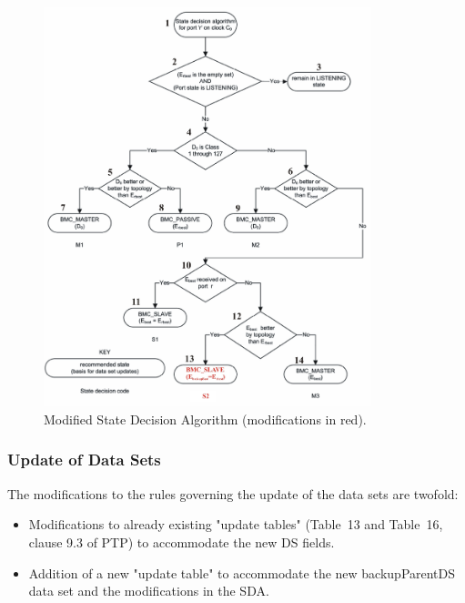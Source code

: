 \documentclass[a4paper, 12pt]{article}
\begin{document}
\begin{figure}[ht!]
  \centering
  \includegraphics[width=0.85\textwidth]{protocol/SDA.pdf}
  \caption{Modified State Decision Algorithm (modifications in red).}
  \label{fig:modifiedSDA}
\end{figure}

\newpage

\subsubsection{Update of Data Sets}

The modifications to the rules governing the update of the data sets are twofold:
\begin{itemize}
  \item Modifications to already existing "update tables" (Table~13 and Table~16, clause 9.3 of
	PTP) to accommodate the new DS fields.
  \item Addition of a new "update table" to accommodate the new backupParentDS data set and 
	the modifications in the SDA.
\end{itemize}
\end{document}
